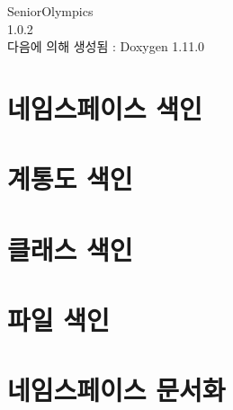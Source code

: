 \documentclass[twoside]{book}
\newcommand{\+}{\discretionary{\mbox{\scriptsize$\hookleftarrow$}}{}{}}
\newcommand{\clearemptydoublepage}{%
    \newpage{\pagestyle{empty}\cleardoublepage}%
  }
\begin{document}
  \raggedbottom
    \hypersetup{pageanchor=false,
                bookmarksnumbered=true,
                pdfencoding=unicode
               }
  \begin{titlepage}
  \vspace*{7cm}
  \begin{center}%
  {\Large Senior\+Olympics}\\
  [1ex]\large 1.\+0.\+2 \\
  \vspace*{1cm}
  {\large 다음에 의해 생성됨 \+:  Doxygen 1.11.0}\\
  \end{center}
  \end{titlepage}
  \clearemptydoublepage
  \tableofcontents
  \clearemptydoublepage
  \hypersetup{pageanchor=true}
\chapter{네임스페이스 색인}

\chapter{계통도 색인}

\chapter{클래스 색인}

\chapter{파일 색인}

\chapter{네임스페이스 문서화}









\end{document}
